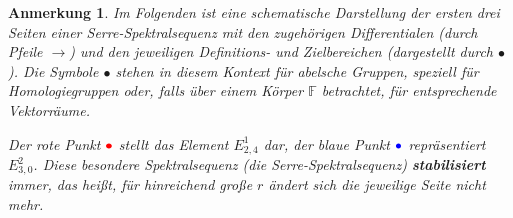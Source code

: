 \documentclass[12pt]{article}
\numberwithin{conj}{section}
\newtheorem{remark}[conj]{Anmerkung}
\begin{document}
    \begin{remark}
        Im Folgenden ist eine schematische Darstellung der ersten drei Seiten einer Serre-Spektralsequenz
        mit den zugehörigen Differentialen (durch Pfeile $\rightarrow$) und den jeweiligen
        Definitions- und Zielbereichen (dargestellt durch $\bullet$). Die Symbole $\bullet$
        stehen in diesem Kontext für abelsche Gruppen, speziell für Homologiegruppen
        oder, falls über einem Körper $\mathbb{F}$ betrachtet, für entsprechende
        Vektorräume.

        Der rote Punkt $\color{red}
        \bullet$ stellt das Element $E^{1}_{2,4}$ dar, der blaue Punkt $\color{blue}
        \bullet$ repräsentiert $E^{2}_{3,0}$. Diese besondere Spektralsequenz (die Serre-Spektralsequenz)
        \textbf{stabilisiert} immer, das heißt, für hinreichend große $r$ ändert sich
        die jeweilige Seite nicht mehr.


\end{remark}
\end{document}
